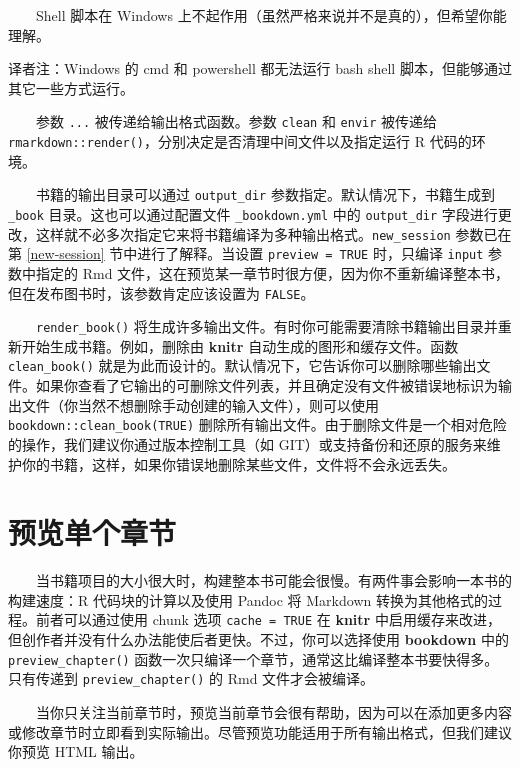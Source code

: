 \documentclass[
  12pt,
]{krantz}
\renewenvironment{quote}{\begin{VF}}{\end{VF}}
\theoremstyle{definition}
\theoremstyle{definition}
\theoremstyle{definition}
\theoremstyle{definition}
\theoremstyle{remark}
\begin{document}
  Shell 脚本在 Windows 上不起作用（虽然严格来说并不是真的），但希望你能理解。

\begin{quote}
译者注：Windows 的 cmd 和 powershell 都无法运行 bash shell 脚本，但能够通过其它一些方式运行。
\end{quote}

  参数 \texttt{...} 被传递给输出格式函数。参数 \texttt{clean} 和 \texttt{envir} 被传递给 \texttt{rmarkdown::render()}，分别决定是否清理中间文件以及指定运行 R 代码的环境。

  书籍的输出目录可以通过 \texttt{output\_dir} 参数指定。默认情况下，书籍生成到 \texttt{\_book} 目录。这也可以通过配置文件 \texttt{\_bookdown.yml} 中的 \texttt{output\_dir} 字段进行更改，这样就不必多次指定它来将书籍编译为多种输出格式。\texttt{new\_session} 参数已在第 \ref{new-session} 节中进行了解释。当设置 \texttt{preview\ =\ TRUE} 时，只编译 \texttt{input} 参数中指定的 Rmd 文件，这在预览某一章节时很方便，因为你不重新编译整本书，但在发布图书时，该参数肯定应该设置为 \texttt{FALSE}。

  \texttt{render\_book()} 将生成许多输出文件。有时你可能需要清除书籍输出目录并重新开始生成书籍。例如，删除由 \textbf{knitr} 自动生成的图形和缓存文件。函数 \texttt{clean\_book()} 就是为此而设计的。默认情况下，它告诉你可以删除哪些输出文件。如果你查看了它输出的可删除文件列表，并且确定没有文件被错误地标识为输出文件（你当然不想删除手动创建的输入文件），则可以使用 \texttt{bookdown::clean\_book(TRUE)} 删除所有输出文件。由于删除文件是一个相对危险的操作，我们建议你通过版本控制工具（如 GIT）或支持备份和还原的服务来维护你的书籍，这样，如果你错误地删除某些文件，文件将不会永远丢失。

\hypertarget{ux9884ux89c8ux5355ux4e2aux7ae0ux8282}{%
\section{预览单个章节}\label{ux9884ux89c8ux5355ux4e2aux7ae0ux8282}}

  当书籍项目的大小很大时，构建整本书可能会很慢。有两件事会影响一本书的构建速度：R 代码块的计算以及使用 Pandoc 将 Markdown 转换为其他格式的过程。前者可以通过使用 chunk 选项 \texttt{cache\ =\ TRUE} 在 \textbf{knitr} 中启用缓存来改进，但创作者并没有什么办法能使后者更快。不过，你可以选择使用 \textbf{bookdown} 中的 \texttt{preview\_chapter()} 函数一次只编译一个章节，通常这比编译整本书要快得多。只有传递到 \texttt{preview\_chapter()} 的 Rmd 文件才会被编译。

  当你只关注当前章节时，预览当前章节会很有帮助，因为可以在添加更多内容或修改章节时立即看到实际输出。尽管预览功能适用于所有输出格式，但我们建议你预览 HTML 输出。
\end{document}
